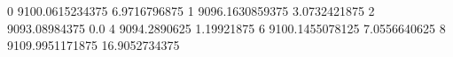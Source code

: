 0 9100.0615234375 6.9716796875
1 9096.1630859375 3.0732421875
2 9093.08984375 0.0
4 9094.2890625 1.19921875
6 9100.1455078125 7.0556640625
8 9109.9951171875 16.9052734375

